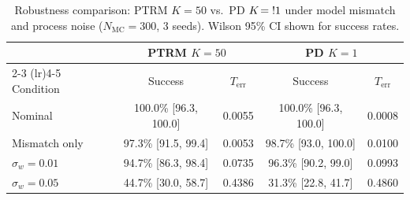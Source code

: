\begin{table}[t]
\centering
\caption{Robustness comparison: PTRM $K\!=\!50$ vs.\ PD $K\!=\\!1$ under model mismatch and process noise ($N_{\mathrm{MC}}=300$, 3 seeds). Wilson 95\% CI shown for success rates.}
\label{tab:robustness}
\begin{tabular}{lcccc}
\toprule
& \multicolumn{2}{c}{PTRM $K\!=\!50$} & \multicolumn{2}{c}{PD $K\!=\!1$} \\
\cmidrule(lr){2-3} \cmidrule(lr){4-5}
Condition & Success & $T_{\mathrm{err}}$ & Success & $T_{\mathrm{err}}$ \\
\midrule
  Nominal & 100.0\% [96.3, 100.0] & 0.0055 & 100.0\% [96.3, 100.0] & 0.0008 \\
  Mismatch only & 97.3\% [91.5, 99.4] & 0.0053 & 98.7\% [93.0, 100.0] & 0.0100 \\
  $\sigma_w=0.01$ & 94.7\% [86.3, 98.4] & 0.0735 & 96.3\% [90.2, 99.0] & 0.0993 \\
  $\sigma_w=0.05$ & 44.7\% [30.0, 58.7] & 0.4386 & 31.3\% [22.8, 41.7] & 0.4860 \\
\bottomrule
\end{tabular}
\end{table}
